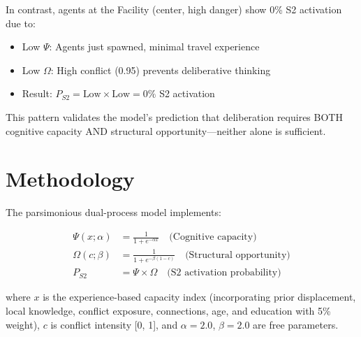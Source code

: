 In contrast, agents at the Facility (center, high danger) show 0\% S2 activation 
due to:
\begin{itemize}
    \item Low $\Psi$: Agents just spawned, minimal travel experience
    \item Low $\Omega$: High conflict (0.95) prevents deliberative thinking
    \item Result: $P_{S2} = \text{Low} \times \text{Low} = 0\%$ S2 activation
\end{itemize}

This pattern validates the model's prediction that deliberation requires BOTH 
cognitive capacity AND structural opportunity—neither alone is sufficient.

\section{Methodology}

The parsimonious dual-process model implements:

\begin{align}
    \Psi(x; \alpha) &= \frac{1}{1 + e^{-\alpha x}} \quad \text{(Cognitive capacity)} \\
    \Omega(c; \beta) &= \frac{1}{1 + e^{-\beta(1-c)}} \quad \text{(Structural opportunity)} \\
    P_{S2} &= \Psi \times \Omega \quad \text{(S2 activation probability)}
\end{align}

where $x$ is the experience-based capacity index (incorporating prior 
displacement, local knowledge, conflict exposure, connections, age, and 
education with 5\% weight), $c$ is conflict intensity [0, 1], and $\alpha=2.0$, 
$\beta=2.0$ are free parameters.

